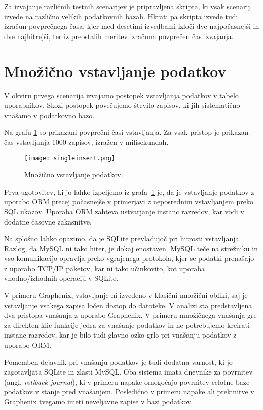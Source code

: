 \documentclass[a4paper,12pt,openright]{book}
\begin{document}
    Za izvajanje različnih testnih scenarijev je pripravljena skripta, ki vsak scenarij izvede na različno velikih podatkovnih bazah. Hkrati pa skripta izvede tudi izračun povprečnega časa, kjer med desetimi izvedbami izloči dve najpočasnejši in dve najhitrejši, ter iz preostalih meritev izračuna povprečen čas izvajanja.

   \section{Množično vstavljanje podatkov}

    V okviru prvega scenarija izvajamo postopek vstavljanja podatkov v tabelo uporabnikov. Skozi postopek povečujemo število zapisov, ki jih sistematično vnašamo v podatkovno bazo.

    Na grafu \ref{vnos} so prikazani povprečni časi vstavljanja. Za vsak pristop je prikazan čas vstavljanja 1000 zapisov, izražen v milisekundah.
   
   \begin{figure}[H]
        \centerline{\texttt{[image: singleinsert.png]}}
        \caption{Množično vstavljanje podatkov.}
        \label{vnos}
    \end{figure}

    \noindent
    Prva ugotovitev, ki jo lahko izpeljemo iz grafa~\ref{vnos} je, da je vstavljanje podatkov z uporabo ORM precej počasnejše v primerjavi z neposrednim vstavljanjem preko SQL ukazov. Uporaba ORM zahteva ustvarjanje instanc razredov, kar vodi v dodatne časovne zakasnitve.

    Na splošno lahko opazimo, da je SQLite prevladujoč pri hitrosti vstavljanja. Razlog, da MySQL ni tako hiter, je dokaj enostaven. MySQL teče na strežniku in vso komunikacijo opravlja preko vgrajenega protokola, kjer se podatki prenašajo z uporabo TCP/IP paketov, kar ni tako učinkovito, kot uporaba vhodno/izhodnih operaciji v SQLite.

    V primeru Graphenix, vstavljanje ni izvedeno v klasični množični obliki, saj je vstavljanje vsakega zapisa ločen dostop do datoteke. V analizi sta predstavljena dva pristopa vnašanja z uporabo Graphenix. V primeru množičnega vnašanja gre za direkten klic funkcije jedra za vnašanje podatkov in ne potrebujemo kreirati instanc razredov, kar je bilo tudi glavno ozko grlo pri vnašanju podatkov z uporabo ORM.

    Pomemben dejavnik pri vnašanju podatkov je tudi dodatna varnost, ki jo zagotavljata SQLite in zlasti MySQL. Oba sistema imata dnevnike za povrnitev (angl. \textit{rollback journal}), ki v primeru napake omogočajo povrnitev celotne baze podatkov v stanje pred vnašanjem. Posledično v primeru napake ali prekinitve v Graphenix tvegamo imeti neveljavne zapise v bazi podatkov.
\end{document}
